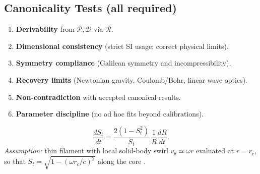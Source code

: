 \documentclass[10pt,reprint,aps,onecolumn,nofootinbib]{revtex4-2}
\begin{document}
    \subsection*{Canonicality Tests (all required)}
    \begin{enumerate}
        \item \textbf{Derivability} from $\mathcal{P},\mathcal{D}$ via $\mathcal{R}$.
        \item \textbf{Dimensional consistency} (strict SI usage; correct physical limits).
        \item \textbf{Symmetry compliance} (Galilean symmetry and incompressibility).
        \item \textbf{Recovery limits} (Newtonian gravity, Coulomb/Bohr, linear wave optics).
        \item \textbf{Non-contradiction} with accepted canonical results.
        \item \textbf{Parameter discipline} (no ad hoc fits beyond calibrations).
    \end{enumerate}
    \begin{tcolorbox}[title=Corollary: Clock--Radius Transport]
        \[
            \frac{dS_t}{dt}=\frac{2(1-S_t^2)}{S_t}\,\frac{1}{R}\frac{dR}{dt}.
        \]
        \textit{Assumption:} thin filament with local solid-body swirl $v_\theta\simeq \omega r$ evaluated at $r=r_c$, so that
        $S_t=\sqrt{1-(\omega r_c/c)^2}$ along the core \cite{Batchelor1967,Saffman1992}. %
    \end{tcolorbox}
\end{document}
